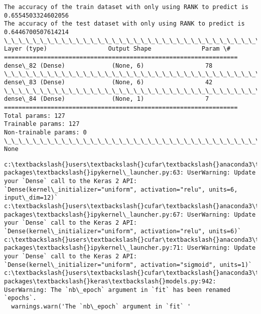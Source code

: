 \documentclass[11pt]{article}
\begin{document}
    \begin{Verbatim}[commandchars=\\\{\}]
The accuracy of the train dataset with only using RANK to predict is 0.6554503324602056
The accuracy of the test dataset with only using RANK to predict is 0.6446700507614214
\_\_\_\_\_\_\_\_\_\_\_\_\_\_\_\_\_\_\_\_\_\_\_\_\_\_\_\_\_\_\_\_\_\_\_\_\_\_\_\_\_\_\_\_\_\_\_\_\_\_\_\_\_\_\_\_\_\_\_\_\_\_\_\_\_
Layer (type)                 Output Shape              Param \#   
=================================================================
dense\_82 (Dense)             (None, 6)                 78        
\_\_\_\_\_\_\_\_\_\_\_\_\_\_\_\_\_\_\_\_\_\_\_\_\_\_\_\_\_\_\_\_\_\_\_\_\_\_\_\_\_\_\_\_\_\_\_\_\_\_\_\_\_\_\_\_\_\_\_\_\_\_\_\_\_
dense\_83 (Dense)             (None, 6)                 42        
\_\_\_\_\_\_\_\_\_\_\_\_\_\_\_\_\_\_\_\_\_\_\_\_\_\_\_\_\_\_\_\_\_\_\_\_\_\_\_\_\_\_\_\_\_\_\_\_\_\_\_\_\_\_\_\_\_\_\_\_\_\_\_\_\_
dense\_84 (Dense)             (None, 1)                 7         
=================================================================
Total params: 127
Trainable params: 127
Non-trainable params: 0
\_\_\_\_\_\_\_\_\_\_\_\_\_\_\_\_\_\_\_\_\_\_\_\_\_\_\_\_\_\_\_\_\_\_\_\_\_\_\_\_\_\_\_\_\_\_\_\_\_\_\_\_\_\_\_\_\_\_\_\_\_\_\_\_\_
None

    \end{Verbatim}

    \begin{Verbatim}[commandchars=\\\{\}]
c:\textbackslash{}users\textbackslash{}cufar\textbackslash{}anaconda3\textbackslash{}envs\textbackslash{}tensorflow\textbackslash{}lib\textbackslash{}site-packages\textbackslash{}ipykernel\_launcher.py:63: UserWarning: Update your `Dense` call to the Keras 2 API: `Dense(kernel\_initializer="uniform", activation="relu", units=6, input\_dim=12)`
c:\textbackslash{}users\textbackslash{}cufar\textbackslash{}anaconda3\textbackslash{}envs\textbackslash{}tensorflow\textbackslash{}lib\textbackslash{}site-packages\textbackslash{}ipykernel\_launcher.py:67: UserWarning: Update your `Dense` call to the Keras 2 API: `Dense(kernel\_initializer="uniform", activation="relu", units=6)`
c:\textbackslash{}users\textbackslash{}cufar\textbackslash{}anaconda3\textbackslash{}envs\textbackslash{}tensorflow\textbackslash{}lib\textbackslash{}site-packages\textbackslash{}ipykernel\_launcher.py:71: UserWarning: Update your `Dense` call to the Keras 2 API: `Dense(kernel\_initializer="uniform", activation="sigmoid", units=1)`
c:\textbackslash{}users\textbackslash{}cufar\textbackslash{}anaconda3\textbackslash{}envs\textbackslash{}tensorflow\textbackslash{}lib\textbackslash{}site-packages\textbackslash{}keras\textbackslash{}models.py:942: UserWarning: The `nb\_epoch` argument in `fit` has been renamed `epochs`.
  warnings.warn('The `nb\_epoch` argument in `fit` '

    \end{Verbatim}
\end{document}
